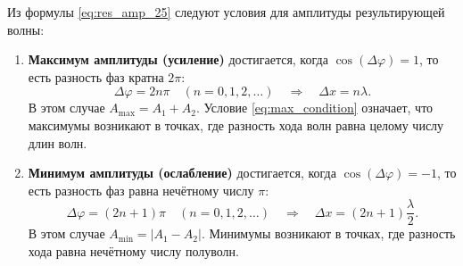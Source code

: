\begin{property}
Из формулы \eqref{eq:res_amp_25} следуют условия для амплитуды результирующей волны:
\begin{enumerate}
    \item \textbf{Максимум амплитуды (усиление)} достигается, когда $\cos(\Delta\varphi) = 1$, то есть разность фаз кратна $2\pi$:
    \begin{equation}
        \Delta\varphi = 2n\pi \quad (n=0, 1, 2, \dots) \quad \Rightarrow \quad \Delta x = n\lambda. \label{eq:max_condition}
    \end{equation}
    В этом случае $A_{\max} = A_1 + A_2$. Условие \eqref{eq:max_condition} означает, что максимумы возникают в точках, где разность хода волн равна целому числу длин волн.
    \item \textbf{Минимум амплитуды (ослабление)} достигается, когда $\cos(\Delta\varphi) = -1$, то есть разность фаз равна нечётному числу $\pi$:
    \begin{equation}
        \Delta\varphi = (2n+1)\pi \quad (n=0, 1, 2, \dots) \quad \Rightarrow \quad \Delta x = (2n+1)\frac{\lambda}{2}. \label{eq:min_condition}
    \end{equation}
    В этом случае $A_{\min} = |A_1 - A_2|$. Минимумы возникают в точках, где разность хода равна нечётному числу полуволн.
\end{enumerate}
\end{property}

